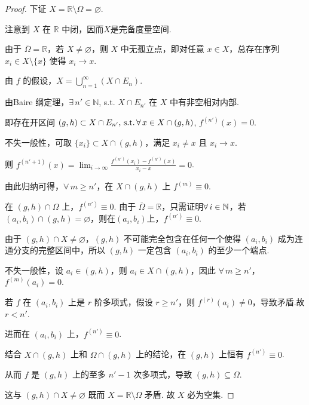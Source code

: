 \begin{proof}
    下证 $X = \mathbb{R} \setminus \Omega = \varnothing$.\par
    注意到 $X$ 在 $\mathbb{R}$ 中闭，因而$X$是完备度量空间.\par
    由于 $\overline{\Omega}=\mathbb{R}$，若 $X \neq \varnothing$，则 $X$ 中无孤立点，即对任意 $x \in X$，总存在序列 $x_i \in X \setminus \{x\}$ 使得 $x_i \to x$.\par
    由 $f$ 的假设，$X = \bigcup_{n=1}^\infty (X \cap E_n)$.\par
    由Baire 纲定理，$\exists\, n' \in \mathbb{N}$, s.t. $X \cap E_{n'}$ 在 $X$ 中有非空相对内部.\par
    即存在开区间 $(g, h)\subset X\cap E_{n'},\operatorname{\,\text{s.t.}} \forall\, x \in X \cap (g, h)$, $f^{(n')}(x) = 0$.\par
    不失一般性，可取 $\{x_i\} \subset X \cap (g, h)$，满足 $x_i \neq x$ 且 $x_i \to x$.\par
    则 $f^{(n'+1)}(x) = \lim_{i\to\infty} \frac{f^{(n')}(x_i) - f^{(n')}(x)}{x_i - x} = 0$.\par
    由此归纳可得，$\forall\, m \geq n'$，在 $X \cap (g, h)$ 上 $f^{(m)} \equiv 0$.\par
    \begin{claim}{在 $(g, h) \cap \Omega$ 上，$f^{(n')} \equiv 0$.}
        由于 $\overline{\Omega} = \mathbb{R}$，只需证明$\forall\, i\in\mathbb{N}$，若$(a_i,b_i)\cap (g,h)=\varnothing$，则在$(a_i,b_i)$上，$f^(n')\equiv 0$.\par
    由于 $(g, h) \cap X \neq \varnothing$，$(g, h)$ 不可能完全包含在任何一个使得 $(a_i, b_i)$ 成为连通分支的完整区间中，所以 $(g, h)$ 一定包含 $(a_i, b_i)$ 的至少一个端点.\par
    不失一般性，设 $a_i \in (g, h)$，则 $a_i \in X \cap (g, h)$，因此 $\forall\, m \geq n'$，$f^{(m)}(a_i) = 0$.\par
    若 $f$ 在 $(a_i, b_i)$ 上是 $r$ 阶多项式，假设 $r \ge n'$，则 $f^{(r)}(a_i) \neq 0$，导致矛盾.故 $r < n'$.\par
    进而在 $(a_i, b_i)$ 上，$f^{(n')} \equiv 0$.
    \end{claim}

    结合 $X \cap (g,h)$ 上和 $\Omega \cap (g,h)$ 上的结论，在 $(g, h)$ 上恒有 $f^{(n')} \equiv 0$.\par
    从而 $f$ 是 $(g, h)$ 上的至多 $n'-1$ 次多项式，导致 $(g, h) \subseteq \Omega$.\par
    这与 $(g, h) \cap X \neq \varnothing$ 既而 $X = \mathbb{R} \setminus \Omega$ 矛盾. 故 $X$ 必为空集.
\end{proof}


